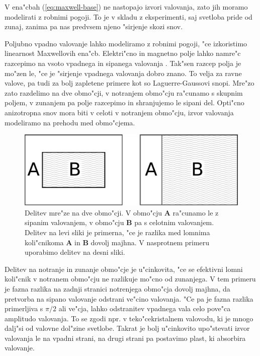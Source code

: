 \documentclass[12pt,twoside,openright,final]{report}
\begin{document}
V ena"cbah (\ref{eq:maxwell-base}) ne nastopajo izvori valovanja, zato jih moramo modelirati z robnimi pogoji. 
To je v skladu z eksperimenti, saj svetloba pride od zunaj, zanima pa nas predvsem njeno "sirjenje skozi snov. 

Poljubno vpadno valovanje lahko modeliramo z robnimi pogoji, "ce izkoristimo linearnost Maxwellovih ena"cb. 
Elektri"cno in magnetno polje lahko namre"c razcepimo na vsoto vpadnega in sipanega valovanja \cite{taflove}. 
Tak"sen razcep polja je mo"zen le, "ce je "sirjenje vpadnega valovanja dobro znano. 
To velja za ravne valove, pa tudi za bolj zapletene primere kot so Laguerre-Gaussovi snopi. 
Mre"zo zato razdelimo na dve obmo"cji, v notranjem obmo"cju ra"cunamo s skupnim poljem, v zunanjem pa polje razcepimo in shranjujemo le sipani del.
Opti"cno anizotropna snov mora biti v celoti v notranjem obmo"cju, izvor valovanja modeliramo na prehodu med obmo"cjema. 

\begin{figure}[h]
 \centering
 \includegraphics[width=.8\textwidth]{wave-source-regions}
 \caption{Delitev mre"ze na dve obmo"cji. V obmo"cju \textbf{A} ra"cunamo le z sipanim valovanjem, v obmo"cju \textbf{B} pa s celotnim valovanjem. Delitev na levi sliki je primerna, "ce je razlika med lomnima koli"cnikoma \textbf{A} in \textbf{B} dovolj majhna. V nasprotnem primeru uporabimo delitev na desni sliki. }
 \label{fig:wave-source-regions}
\end{figure}

Delitev na notranje in zunanje obmo"cje je u"cinkovita, "ce se efektivni lomni koli"cnik v notranem obmo"cju ne razlikuje mo"cno od zunanjega. 
V tem primeru je fazna razlika na zadnji stranici notrenjega obmo"cja dovolj majhna, da pretvorba na sipano valovanje odstrani ve"cino valovanja. 
"Ce pa je fazna razlika primerljiva s $\pi/2$ ali ve"cja, lahko odstranitev vpadnega vala celo pove"ca amplitudo valovanja. 
To se zgodi npr. v teko"cekristalnem valovodu, ki je mnogo dalj"si od valovne dol"zine svetlobe. 
Takrat je bolj u"cinkovito upo"stevati izvor valovanja le na vpadni strani, na drugi strani pa postavimo plast, ki absorbira valovanje. 
\end{document}
